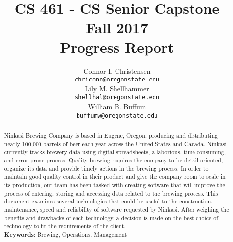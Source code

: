 \documentclass[draftclsnofoot,onecolumn,letterpaper,10pt,compsoc]{IEEEtran}
\title{CS 461 - CS Senior Capstone
	\\Fall 2017
	\\Progress Report
}
\author{
	Connor I. Christensen \\
	\texttt{chriconn@oregonstate.edu}
	\\
	Lily M. Shellhammer \\
	\texttt{shellhal@oregonstate.edu}
	\\
	William B. Buffum \\
	\small{}
	\texttt{buffumw@oregonstate.edu}
}
\begin{document}
\begin{titlingpage}
    \maketitle
    \begin{abstract}
			Ninkasi Brewing Company is based in Eugene, Oregon, producing and distributing nearly 100,000 barrels of beer each year across the United States and Canada.
			Ninkasi currently tracks brewery data using digital spreadsheets, a laborious, time consuming, and error prone process.
			Quality brewing requires the company to be detail-oriented, organize its data and provide timely actions in the brewing process.
			In order to maintain good quality control in their product and give the company room to scale in its production, our team has been tasked with creating software that will improve the process of entering, storing and accessing data related to the brewing process.
			This document examines several technologies that could be useful to the construction, maintenance, speed and reliability of software requested by Ninkasi.
			After weighing the benefits and drawbacks of each technology, a decision is made on the best choice of technology to fit the requirements of the client.
			\\
			\textbf{Keywords:} Brewing, Operations, Management
    \end{abstract}
		\pagebreak
		\tableofcontents
\end{titlingpage}
\end{document}

